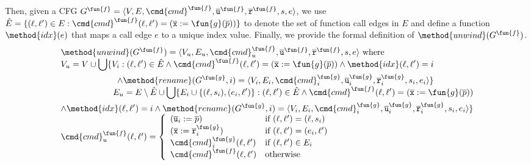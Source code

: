 Then, given a CFG $G^\fun{f}=\langle V, E,\cmd{cmd}^\fun{f},
\overline{\texttt{u}}^\fun{f}, \overline{\texttt{r}}^\fun{f},s,e \rangle$,
we use $\hat{E} =\{(\ell, \ell')\in E: \cmd{cmd}^\fun{f} (\ell,\ell')=(\overline{\texttt{x}}:=\fun{g}(\overline{p}))\}$ to denote the set of function call edges in $E$ and define a function $\method{idx}(e)$ that maps a call edge $e$ to a unique index value.
Finally, we provide the formal definition of $\method{unwind}(G^\fun{f})$.
\[
\begin{array}{l}
\method{unwind}(G^\fun{f}) = \langle V_u, E_u,\cmd{cmd}_u^\fun{f}, \overline{\texttt{u}}^\fun{f}, \overline{\texttt{r}}^\fun{f},s,e \rangle \text{ where} \\

\begin{aligned}
 V_u = V\cup\bigcup\{V_i:(\ell,\ell')\in\hat{E} \wedge \cmd{cmd}^\fun{f}(\ell,\ell')=(\overline{\texttt{x}}:=\fun{g}(\overline{p}))\wedge\method{idx}(\ell, \ell')=i  \\
  \wedge \method{rename}(G^\fun{g},i)=\langle V_i, E_i,\cmd{cmd}^\fun{g}_i, \overline{\texttt{u}}^\fun{g}_i, \overline{\texttt{r}}^\fun{g}_i,s_i,e_i\rangle \}
\end{aligned}\\

\begin{aligned}
 E_u = E \setminus \hat{E} \cup \bigcup\{E_i\cup\{(\ell, s_i),(e_i, \ell')\}: (\ell, \ell')\in \hat{E} \wedge \cmd{cmd}^\fun{f}(\ell, \ell')=(\overline{\texttt{x}}:=\fun{g}(\overline{p})) \\
  \wedge \method{idx}(\ell, \ell')=i \wedge \method{rename}(G^\fun{g},i) =
\langle V_i, E_i,\cmd{cmd}^\fun{g}_i, \overline{\texttt{u}}^\fun{g}_i, \overline{\texttt{r}}^\fun{g}_i,s_i,e_i\rangle \}
\end{aligned}\\

\cmd{cmd}_u^\fun{f} (\ell, \ell') =
\left\{
  \begin{array}{ll}
  (\overline{\texttt{u}}_i:=\overline{p}) &\text{if } (\ell,\ell')=(\ell,s_i)
  \\
  (\overline{\texttt{x}}:=\overline{\texttt{r}}^\fun{g}_i) &\text{if } (\ell,\ell')=(e_i,\ell') \\
  \cmd{cmd}^\fun{g}_i(\ell, \ell') &\text{if } (\ell, \ell') \in E_i \\
  \cmd{cmd}^\fun{f}(\ell,\ell') &\text{otherwise}
  \end{array}
\right.

\end{array}
\]

